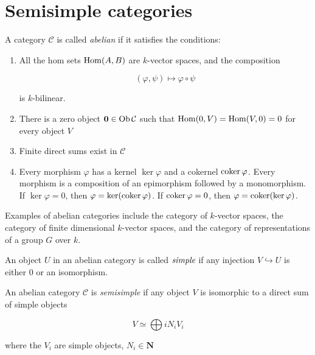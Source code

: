 \section{Semisimple categories}
\begin{defn}
    A category $\mathcal{C}$ is called \emph{abelian} if it satisfies the conditions:

    \begin{enumerate}
    \renewcommand{\labelenumi}{\roman{enumi})}
        \item All the hom sets $\operatorname{Hom}(A,B)$ are $k$-vector spaces, and the composition
            
            \begin{equation}
                (\varphi, \psi) \mapsto \varphi \circ \psi
            \end{equation}

            is $k$-bilinear.
        \item There is a zero object $\mathbf{0} \in \operatorname{Ob} \mathcal{C}$ such that
            $\operatorname{Hom}(0,V) = \operatorname{Hom}(V,0) = 0$ for every object $V$
        \item Finite direct sums exist in $\mathcal{C}$
        \item Every morphism $\varphi$ has a kernel $\ker \varphi$ and a
            cokernel $\operatorname{coker} \varphi$. Every morphism is a composition of an
            epimorphism followed by a monomorphism. If $\ker \varphi = 0$, then
            $\varphi = \ker(\operatorname{coker} \varphi)$. If $\operatorname{coker} \varphi = 0$, then
            $\varphi = \operatorname{coker}(\ker \varphi)$.
    \end{enumerate}

    Examples of abelian categories include the category of $k$-vector spaces,
    the category of finite dimensional $k$-vector spaces, and the category of
    representations of a group $G$ over $k$.

\end{defn}

\begin{defn}
    An object $U$ in an abelian category is called $\emph{simple}$ if any
    injection $V \hookrightarrow U$ is either $0$ or an isomorphism.
\end{defn}

\begin{defn}
    An abelian category $\mathcal{C}$ is \emph{semisimple} if any object $V$ is isomorphic to a direct sum of simple objects

    \begin{equation}
        V \simeq \bigoplus{i} N_i V_i
    \end{equation}

    where the $V_i$ are simple objects, $N_i \in \mathbf{N}$

\end{defn}

